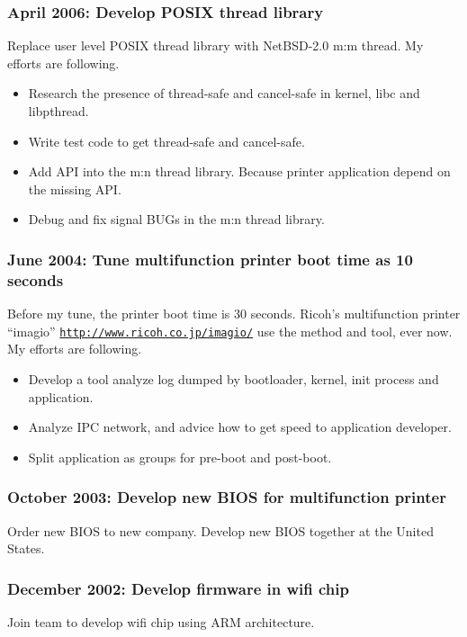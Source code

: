 \documentclass[letterpaper]{article}
\begin{document}
\subsubsection*{April 2006: Develop POSIX thread library}
Replace user level POSIX thread library with NetBSD-2.0 m:m thread.
My efforts are following.
\begin{itemize}
  \item Research the presence of thread-safe and cancel-safe in kernel, libc and libpthread.
  \item Write test code to get thread-safe and cancel-safe.
  \item Add API into the m:n thread library. Because printer application depend on the missing API.
  \item Debug and fix signal BUGs in the m:n thread library.
\end{itemize}

\subsubsection*{June 2004: Tune multifunction printer boot time as 10 seconds}
Before my tune, the printer boot time is 30 seconds.
Ricoh's multifunction printer ``imagio'' \href{http://www.ricoh.co.jp/imagio/}{\tt http://www.ricoh.co.jp/imagio/} use the method and tool, ever now.
My efforts are following.

\begin{itemize}
  \item Develop a tool analyze log dumped by bootloader, kernel, init process and application.
  \item Analyze IPC network, and advice how to get speed to application developer.
  \item Split application as groups for pre-boot and post-boot.
\end{itemize}

\subsubsection*{October 2003: Develop new BIOS for multifunction printer}
Order new BIOS to new company.
Develop new BIOS together at the United States.

\subsubsection*{December 2002: Develop firmware in wifi chip}
Join team to develop wifi chip using ARM architecture.
\end{document}
